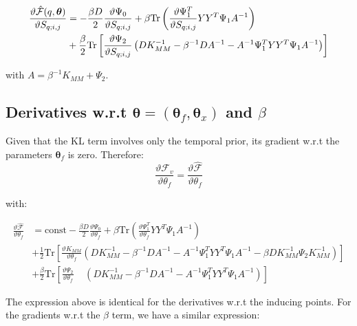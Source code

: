 \begin{align}
 \frac{\vartheta \hat{\mathcal{F}}(q, \boldsymbol \theta)}{\vartheta S_{q;i,j}}
{}& = - \frac{\beta D}{2} \frac{\vartheta \Psi_0}{\vartheta S_{q;i,j}}
    + \beta \text{Tr} \left(\frac{\vartheta \Psi_1^T}{\vartheta S_{q;i,j}} Y Y^T \Psi_1 A^{-1} \right) \nonumber \\
{}& + \frac{\beta}{2} \text{Tr} \left[ \frac{\vartheta \Psi_2}{\vartheta S_{q;i,j}}
       \left(
	  D K_{MM}^{-1} - \beta^{-1} D A^{-1} - A^{-1} \Psi_1^T Y Y^T \Psi_1 A^{-1}
       \right) \right] \label{derivFTildeEfficientComputationS}
\end{align}


with $A=\beta^{-1}K_{MM}+\Psi_2$.





\subsection{Derivatives w.r.t $\boldsymbol \theta = (\boldsymbol \theta_f, \boldsymbol \theta_x)$ and $\beta$}
Given that the KL term involves only the temporal prior, its gradient w.r.t the parameters $\boldsymbol \theta_f$ is zero. Therefore:
\begin{equation}
   \label{DerivativeOfFComplete}
      \frac{\vartheta \mathcal{F}_v}{\vartheta \theta_f} = \frac{\vartheta \hat{\mathcal{F}}}{\vartheta \theta_f}
\end{equation}

  with:

\begin{align}
\frac{\vartheta \hat{\mathcal{F}}}{\vartheta \theta_f} {}& = \text{const} - 
\frac{\beta D}{2} \frac{\vartheta \Psi_0}{\vartheta \theta_f}
 + \beta \text{Tr} \left(\frac{\vartheta \Psi_1^T}{\vartheta \theta_f} Y Y^T \Psi_1 A^{-1} \right) \nonumber \\
{}& + \frac{1}{2} \text{Tr} \left[ \frac{\vartheta K_{MM}}{\vartheta \theta_f}
        \left(
	   D K_{MM}^{-1} - \beta^{-1} D A^{-1} - A^{-1} \Psi_1^T Y Y^T \Psi_1 A^{-1} - \beta D K_{MM}^{-1} \Psi_2 K_{MM}^{-1} 
         \right) \right] \nonumber \\
{}& + \frac{\beta}{2} \text{Tr} \left[ \frac{\vartheta \Psi_2}{\vartheta \theta_f} \;\;\;\;
       \left(
	  D K_{MM}^{-1} - \beta^{-1} D A^{-1} - A^{-1} \Psi_1^T Y Y^T \Psi_1 A^{-1}
       \right) \right] \label{DerivativeOfFtildeComplete}
\end{align}

The expression above is identical for the derivatives w.r.t the inducing points.
For the gradients w.r.t the $\beta$ term, we have a similar expression:



